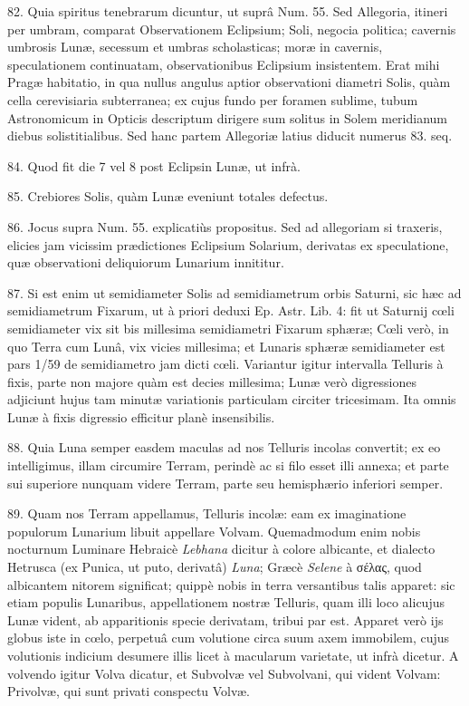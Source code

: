 \documentclass[a4paper, 11pt, oneside, polutonikogreek, german]{article}
\begin{document}
82. Quia spiritus tenebrarum dicuntur, ut suprâ Num. 55. Sed Allegoria, itineri per umbram, comparat Observationem Eclipsium; Soli, negocia politica; cavernis umbrosis Lunæ, secessum et umbras scholasticas; moræ in cavernis, speculationem continuatam, observationibus Eclipsium insistentem. Erat mihi Pragæ habitatio, in qua nullus angulus aptior observationi diametri Solis, quàm cella cerevisiaria subterranea; ex cujus fundo per foramen sublime, tubum Astronomicum in Opticis descriptum dirigere sum solitus in Solem meridianum diebus solistitialibus. Sed hanc partem Allegoriæ latius diducit numerus 83. seq.

84. Quod fit die 7 vel 8 post Eclipsin Lunæ, ut infrà.

85. Crebiores Solis, quàm Lunæ eveniunt totales defectus.

86. Jocus supra Num. 55. explicatiùs propositus. Sed ad allegoriam si traxeris, elicies jam vicissim prædictiones Eclipsium Solarium, derivatas ex speculatione, quæ observationi deliquiorum Lunarium innititur.

87. Si est enim ut semidiameter Solis ad semidiametrum orbis Saturni, sic hæc ad semidiametrum Fixarum, ut à priori deduxi Ep. Astr. Lib. 4: fit ut Saturnij cœli semidiameter vix sit bis millesima semidiametri Fixarum sphæræ; Cœli verò, in quo Terra cum Lunâ, vix vicies millesima; et Lunaris sphæræ semidiameter est pars 1/59 de semidiametro jam dicti cœli. Variantur igitur intervalla Telluris à fixis, parte non majore quàm est decies millesima; Lunæ verò digressiones adjiciunt hujus tam minutæ variationis particulam circiter tricesimam. Ita omnis Lunæ à fixis digressio efficitur planè insensibilis.

88. Quia Luna semper easdem maculas ad nos Telluris incolas convertit; ex eo intelligimus, illam circumire Terram, perindè ac si filo esset illi annexa; et parte sui superiore nunquam videre Terram, parte seu hemisphærio inferiori semper.

89. Quam nos Terram appellamus, Telluris incolæ: eam ex imaginatione populorum Lunarium libuit appellare Volvam. Quemadmodum enim nobis nocturnum Luminare Hebraicè \emph{Lebhana} dicitur à colore albicante, et dialecto Hetrusca (ex Punica, ut puto, derivatâ) \emph{Luna}; Græcè \emph{Selene} à σέλας, quod albicantem nitorem significat; quippè nobis in terra versantibus talis apparet: sic etiam populis Lunaribus, appellationem nostræ Telluris, quam illi loco alicujus Lunæ vident, ab apparitionis specie derivatam, tribui par est. Apparet verò ijs globus iste in cœlo, perpetuâ cum volutione circa suum axem immobilem, cujus volutionis indicium desumere illis licet à macularum varietate, ut infrà dicetur. A volvendo igitur Volva dicatur, et Subvolvæ vel Subvolvani, qui vident Volvam: Privolvæ, qui sunt privati conspectu Volvæ.
\end{document}
